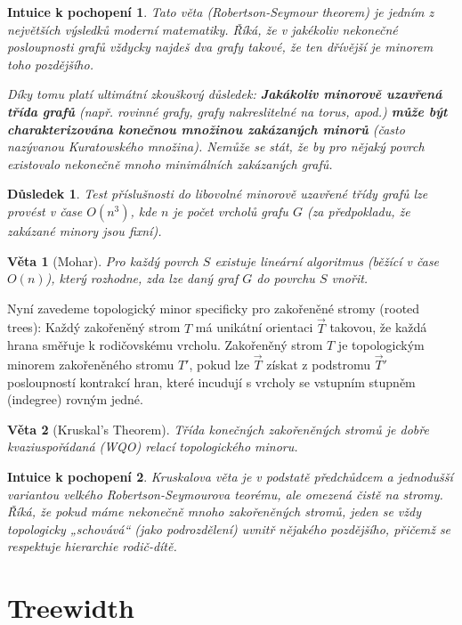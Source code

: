 \documentclass[a4paper,11pt]{article}
\newtheorem{theorem}{Věta}[section]
\newtheorem{corollary}{Důsledek}[section]
\newtheorem*{intuition}{Intuice k pochopení}
\begin{document}
\begin{intuition}
Tato věta (Robertson-Seymour theorem) je jedním z největších výsledků moderní matematiky. Říká, že v jakékoliv nekonečné posloupnosti grafů vždycky najdeš dva grafy takové, že ten dřívější je minorem toho pozdějšího. 

Díky tomu platí ultimátní zkouškový důsledek: \textbf{Jakákoliv minorově uzavřená třída grafů} (např. rovinné grafy, grafy nakreslitelné na torus, apod.) \textbf{může být charakterizována konečnou množinou zakázaných minorů} (často nazývanou Kuratowského množina). Nemůže se stát, že by pro nějaký povrch existovalo nekonečně mnoho minimálních zakázaných grafů.
\end{intuition}

\begin{corollary}
Test příslušnosti do libovolné minorově uzavřené třídy grafů lze provést v čase $O(n^3)$, kde $n$ je počet vrcholů grafu $G$ (za předpokladu, že zakázané minory jsou fixní).
\end{corollary}

\begin{theorem}[Mohar]
Pro každý povrch $S$ existuje lineární algoritmus (běžící v čase $O(n)$), který rozhodne, zda lze daný graf $G$ do povrchu $S$ vnořit.
\end{theorem}

Nyní zavedeme topologický minor specificky pro zakořeněné stromy (rooted trees):
Každý zakořeněný strom $T$ má unikátní orientaci $\vec{T}$ takovou, že každá hrana směřuje k rodičovskému vrcholu. Zakořeněný strom $T$ je topologickým minorem zakořeněného stromu $T'$, pokud lze $\vec{T}$ získat z podstromu $\vec{T}'$ posloupností kontrakcí hran, které incudují s vrcholy se vstupním stupněm (indegree) rovným jedné.

\begin{theorem}[Kruskal's Theorem]
Třída konečných zakořeněných stromů je dobře kvaziuspořádaná (WQO) relací topologického minoru.
\end{theorem}

\begin{intuition}
Kruskalova věta je v podstatě předchůdcem a jednodušší variantou velkého Robertson-Seymourova teorému, ale omezená čistě na stromy. Říká, že pokud máme nekonečně mnoho zakořeněných stromů, jeden se vždy topologicky „schovává“ (jako podrozdělení) uvnitř nějakého pozdějšího, přičemž se respektuje hierarchie rodič-dítě.
\end{intuition}

\section{Treewidth}
\end{document}
